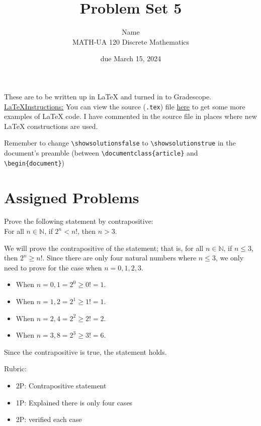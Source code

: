 \documentclass{article}
\title{Problem Set 5}
\author{%
    Name
\\  MATH-UA 120 Discrete Mathematics
}
\date{due March 15, 2024}
\newif\ifshowsolutions
\newcommand{\danger}{\marginpar[\hfill\dbend]{\dbend\hfill}}
\theoremstyle{definition}
\begin{document}
\maketitle



These are to be written up in \LaTeX{} and turned in to Gradescope.\\



\ifshowsolutions
    \SetupExSheets{solution/print=true}
\else
    \danger
 \underline{ \LaTeX  Instructions:}  You can view the source (\texttt{.tex}) file \href{https://bit.ly/43f8Zmb}{here} to get some more examples of \LaTeX{} code.  I have commented in the source file in places where new \LaTeX{} constructions are used.
  
  Remember to change \verb|\showsolutionsfalse| to \verb|\showsolutionstrue|
    in the document's preamble 
    (between \verb|\documentclass{article}| and \verb|\begin{document}|)
\fi

\section*{Assigned Problems}

\begin{question}{5}
    Prove the following statement by contrapositive: \\
    For all $n\in \mathbb{N}$, if $2^n<n!$, then $n>3$.
\end{question}
\begin{solution}
We will prove the contrapositive of the statement; that is, for all $n\in \mathbb{N}$, if $n\leq 3$, then $2^n\geq n!$. Since there are only four natural numbers where $n\leq 3$, we only need to prove for the case when $n=0, 1, 2, 3$.
\begin{itemize}
\item When $n=0, 1 = 2^0 \geq 0!=1.$
\item When $n=1, 2 = 2^1 \geq 1!=1.$
\item When $n=2, 4 = 2^2 \geq 2!=2.$
\item When $n=3, 8 = 2^3 \geq 3!=6.$
\end{itemize}
Since the contrapositive is true, the statement holds.

{\color{red} Rubric:
\begin{itemize}
\item 2P: Contrapositive statement
\item 1P: Explained there is only four cases
\item 2P: verified each case
\end{itemize}}
\end{solution}
\end{document}
